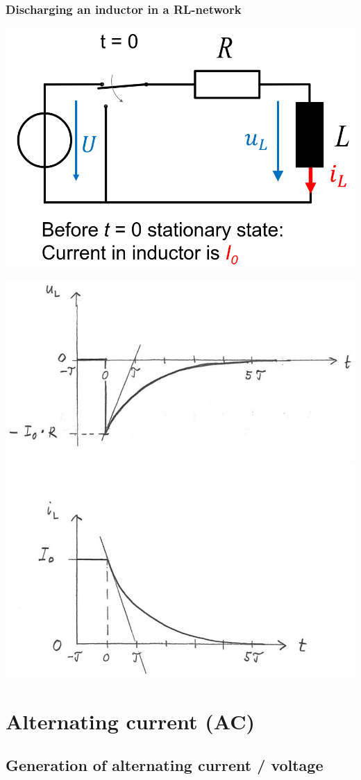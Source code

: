 \documentclass{article}
\begin{document}
\subsubsection{Discharging an inductor in a RL-network}
\begin{center}
    \includegraphics[width=.5\textwidth]{media/inductor_ex2.png}
\end{center}


\begin{center}
    \includegraphics[width=.45\textwidth]{media/inductor_ex2_graph.png}
\end{center}

\newpage
\section{Alternating current (AC)}
\subsection{Generation of alternating current / voltage}
\end{document}
